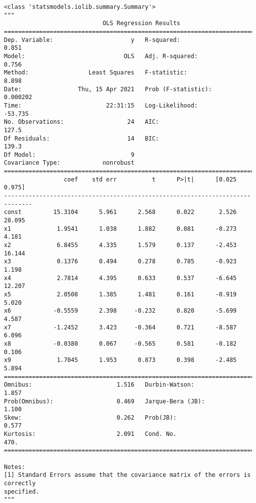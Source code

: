 \documentclass[11pt]{ctexart}
\makeatletter
\newcommand{\boxspacing}{\kern\kvtcb@left@rule\kern\kvtcb@boxsep}
\newcommand{\prompt}[4]{
        {\ttfamily\llap{{\color{#2}[#3]:\hspace{3pt}#4}}\vspace{-\baselineskip}}
    }
\makeatother
\begin{document}
            \begin{tcolorbox}[breakable, size=fbox, boxrule=.5pt, pad at break*=1mm, opacityfill=0]
\prompt{Out}{outcolor}{3}{\boxspacing}
\begin{Verbatim}[commandchars=\\\{\}]
<class 'statsmodels.iolib.summary.Summary'>
"""
                            OLS Regression Results
==============================================================================
Dep. Variable:                      y   R-squared:                       0.851
Model:                            OLS   Adj. R-squared:                  0.756
Method:                 Least Squares   F-statistic:                     8.898
Date:                Thu, 15 Apr 2021   Prob (F-statistic):           0.000202
Time:                        22:31:15   Log-Likelihood:                -53.735
No. Observations:                  24   AIC:                             127.5
Df Residuals:                      14   BIC:                             139.3
Df Model:                           9
Covariance Type:            nonrobust
==============================================================================
                 coef    std err          t      P>|t|      [0.025      0.975]
------------------------------------------------------------------------------
const         15.3104      5.961      2.568      0.022       2.526      28.095
x1             1.9541      1.038      1.882      0.081      -0.273       4.181
x2             6.8455      4.335      1.579      0.137      -2.453      16.144
x3             0.1376      0.494      0.278      0.785      -0.923       1.198
x4             2.7814      4.395      0.633      0.537      -6.645      12.207
x5             2.0508      1.385      1.481      0.161      -0.919       5.020
x6            -0.5559      2.398     -0.232      0.820      -5.699       4.587
x7            -1.2452      3.423     -0.364      0.721      -8.587       6.096
x8            -0.0380      0.067     -0.565      0.581      -0.182       0.106
x9             1.7045      1.953      0.873      0.398      -2.485       5.894
==============================================================================
Omnibus:                        1.516   Durbin-Watson:                   1.857
Prob(Omnibus):                  0.469   Jarque-Bera (JB):                1.100
Skew:                           0.262   Prob(JB):                        0.577
Kurtosis:                       2.091   Cond. No.                         470.
==============================================================================

Notes:
[1] Standard Errors assume that the covariance matrix of the errors is correctly
specified.
"""
\end{Verbatim}
\end{tcolorbox}
        
\end{document}
